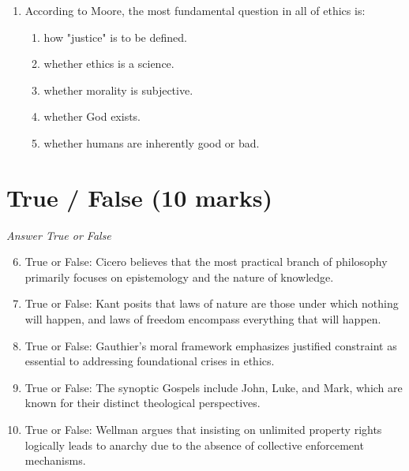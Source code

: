 \documentclass[12pt]{article}
\begin{document}
\begin{enumerate}[label=\arabic*.]
\begin{enumerate}[label=(\alph*)]
    \item Wealth and prosperity
    \item Fear and obedience
    \item Knowledge and education
    \item Power and influence
    \item Truth and love
\end{enumerate}
\item According to Moore, the most fundamental question in all of ethics is:
\begin{enumerate}[label=(\alph*)]
    \item how "justice" is to be defined.
    \item whether ethics is a science.
    \item whether morality is subjective.
    \item whether God exists.
    \item whether humans are inherently good or bad.
\end{enumerate}
\end{enumerate}

\section*{True / False (10 marks)}
\textit{Answer True or False}
\begin{enumerate}[label=\arabic*.]
\setcounter{enumi}{5}
\item True or False: Cicero believes that the most practical branch of philosophy primarily focuses on epistemology and the nature of knowledge.
\item True or False: Kant posits that laws of nature are those under which nothing will happen, and laws of freedom encompass everything that will happen.
\item True or False: Gauthier's moral framework emphasizes justified constraint as essential to addressing foundational crises in ethics.
\item True or False: The synoptic Gospels include John, Luke, and Mark, which are known for their distinct theological perspectives.
\item True or False: Wellman argues that insisting on unlimited property rights logically leads to anarchy due to the absence of collective enforcement mechanisms.
\end{enumerate}
\end{document}

